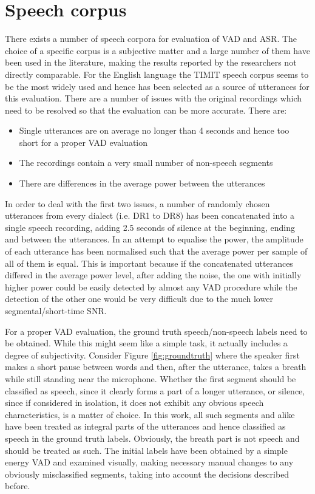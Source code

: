 
\section{Speech corpus}

There exists a number of speech corpora for evaluation of VAD and ASR. The choice of a specific corpus is a subjective matter and a large number of them have been used in the literature, making the results reported by the researchers not directly comparable. For the English language the TIMIT speech corpus \cite{TIMIT} seems to be the most widely used and hence has been selected as a source of utterances for this evaluation. There are a number of issues with the original recordings which need to be resolved so that the evaluation can be more accurate. There are:

\begin{itemize}
\item Single utterances are on average no longer than 4 seconds and hence too short for a proper VAD evaluation
\item The recordings contain a very small number of non-speech segments
\item There are differences in the average power between the utterances
\end{itemize}

In order to deal with the first two issues, a number of randomly chosen utterances from every dialect (i.e. DR1 to DR8) has been concatenated into a single speech recording, adding 2.5 seconds of silence at the beginning, ending and between the utterances. In an attempt to equalise the power, the amplitude of each utterance has been normalised such that the average power per sample of all of them is equal. This is important because if the concatenated utterances differed in the average power level, after adding the noise, the one with initially higher power could be easily detected by almost any VAD procedure while the detection of the other one would be very difficult due to the much lower segmental/short-time SNR.

For a proper VAD evaluation, the ground truth speech/non-speech labels need to be obtained. While this might seem like a simple task, it actually includes a degree of subjectivity. Consider Figure \ref{fig:groundtruth} where the speaker first makes a short pause between words and then, after the utterance, takes a breath while still standing near the microphone. Whether the first segment should be classified as speech, since it clearly forms a part of a longer utterance, or silence, since if considered in isolation, it does not exhibit any obvious speech characteristics, is a matter of choice. In this work, all such segments and alike have been treated as integral parts of the utterances and hence classified as speech in the ground truth labels. Obviously, the breath part is not speech and should be treated as such. The initial labels have been obtained by a simple energy VAD and examined visually, making necessary manual changes to any obviously misclassified segments, taking into account the decisions described before.


